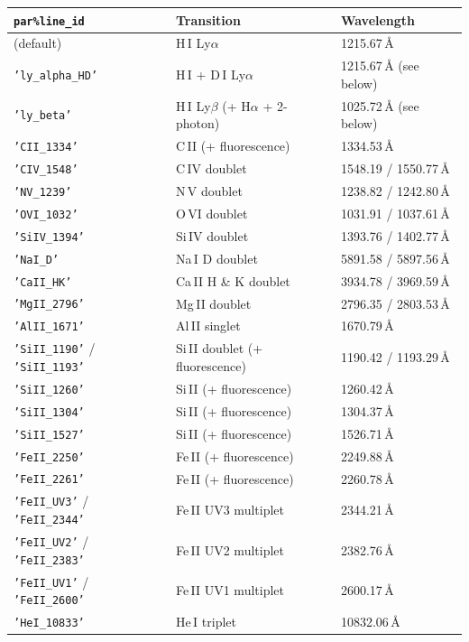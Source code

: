 \documentclass[english,a4paper]{my_memo}
\newcommand{\parm}[1]{\texttt{par\%#1}}
\newcommand{\ion}[2]{#1\,{\scriptsize #2}}
\begin{document}
\begin{center}
\begin{tabular}{@{}l@{\hspace{1.5em}}l@{\hspace{1.5em}}l@{}}
\toprule
\parm{line\_id} & Transition & Wavelength \\
\midrule
(default) & \ion{H}{I} Ly$\alpha$ & 1215.67\,\AA \\
\texttt{'ly\_alpha\_HD'} & \ion{H}{I} + \ion{D}{I} Ly$\alpha$ & 1215.67\,\AA{} (see below) \\
\texttt{'ly\_beta'} & \ion{H}{I} Ly$\beta$ (+ H$\alpha$ + 2-photon) & 1025.72\,\AA{} (see below) \\
\texttt{'CII\_1334'} & \ion{C}{II} (+ fluorescence) & 1334.53\,\AA \\
\texttt{'CIV\_1548'} & \ion{C}{IV} doublet & 1548.19 / 1550.77\,\AA \\
\texttt{'NV\_1239'} & \ion{N}{V} doublet & 1238.82 / 1242.80\,\AA \\
\texttt{'OVI\_1032'} & \ion{O}{VI} doublet & 1031.91 / 1037.61\,\AA \\
\texttt{'SiIV\_1394'} & \ion{Si}{IV} doublet & 1393.76 / 1402.77\,\AA \\
\texttt{'NaI\_D'} & \ion{Na}{I} D doublet & 5891.58 / 5897.56\,\AA \\
\texttt{'CaII\_HK'} & \ion{Ca}{II} H \& K doublet & 3934.78 / 3969.59\,\AA \\
\texttt{'MgII\_2796'} & \ion{Mg}{II} doublet & 2796.35 / 2803.53\,\AA \\
\texttt{'AlII\_1671'} & \ion{Al}{II} singlet & 1670.79\,\AA \\
\texttt{'SiII\_1190'} / \texttt{'SiII\_1193'} & \ion{Si}{II} doublet (+ fluorescence) & 1190.42 / 1193.29\,\AA \\
\texttt{'SiII\_1260'} & \ion{Si}{II} (+ fluorescence) & 1260.42\,\AA \\
\texttt{'SiII\_1304'} & \ion{Si}{II} (+ fluorescence) & 1304.37\,\AA \\
\texttt{'SiII\_1527'} & \ion{Si}{II} (+ fluorescence) & 1526.71\,\AA \\
\texttt{'FeII\_2250'} & \ion{Fe}{II} (+ fluorescence) & 2249.88\,\AA \\
\texttt{'FeII\_2261'} & \ion{Fe}{II} (+ fluorescence) & 2260.78\,\AA \\
\texttt{'FeII\_UV3'} / \texttt{'FeII\_2344'} & \ion{Fe}{II} UV3 multiplet & 2344.21\,\AA \\
\texttt{'FeII\_UV2'} / \texttt{'FeII\_2383'} & \ion{Fe}{II} UV2 multiplet & 2382.76\,\AA \\
\texttt{'FeII\_UV1'} / \texttt{'FeII\_2600'} & \ion{Fe}{II} UV1 multiplet & 2600.17\,\AA \\
\texttt{'HeI\_10833'} & \ion{He}{I} triplet & 10832.06\,\AA \\
\bottomrule
\end{tabular}
\end{center}
\end{document}
